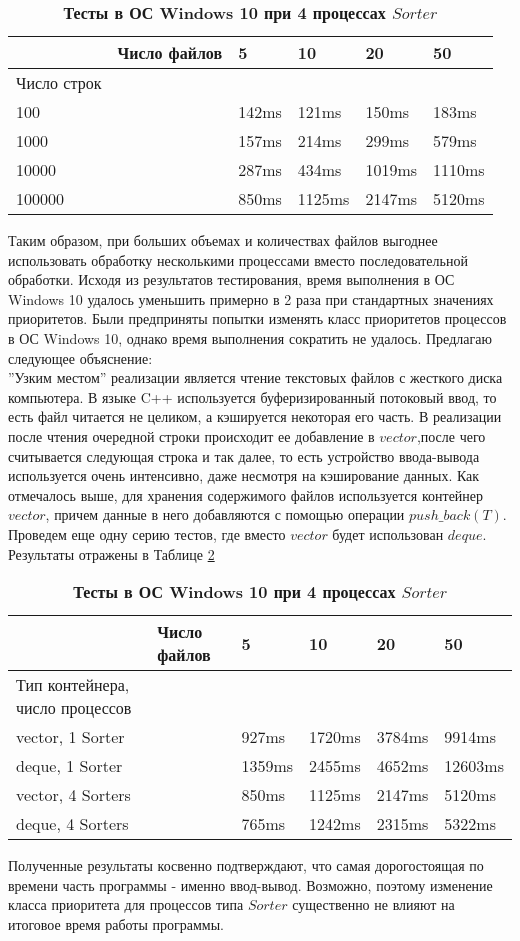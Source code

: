 \begin{table}[H]
\begin{tabularx}{\textwidth}{|X|X|X|X|X|X|}
\hline
&Число файлов& 5 & 10 & 20 & 50 \\
\hline
Число строк&&&&&\\
\hline
100 && 142ms & 121ms & 150ms & 183ms\\
\hline
1000 && 157ms & 214ms & 299ms & 579ms\\
\hline
10000 && 287ms & 434ms & 1019ms & 1110ms\\
\hline
100000 && 850ms & 1125ms & 2147ms & 5120ms\\
\hline
\end{tabularx}
\caption{\textbf{Тесты в ОС Windows 10 при 4 процессах $Sorter$}}
\label{Tables:Windows::tests2}
\end{table}
Таким образом, при больших объемах и количествах файлов выгоднее использовать обработку несколькими процессами вместо последовательной обработки. Исходя из результатов тестирования, время выполнения в ОС Windows 10 удалось уменьшить примерно в 2 раза при стандартных значениях приоритетов. Были предприняты попытки изменять класс приоритетов процессов в ОС Windows 10, однако время выполнения сократить не удалось. Предлагаю следующее объяснение:\\
''Узким местом'' реализации является чтение текстовых файлов с жесткого диска компьютера. В языке C++ используется буферизированный потоковый ввод, то есть файл читается не целиком, а кэшируется некоторая его часть. В реализации после чтения очередной строки происходит ее добавление в $vector$,после чего считывается следующая строка и так далее, то есть устройство ввода-вывода используется очень интенсивно, даже несмотря на кэширование данных. Как отмечалось выше, для хранения содержимого файлов используется контейнер $vector$, причем данные в него добавляются с помощью операции $push\_back(T)$. Проведем еще одну серию тестов, где вместо $vector$ будет использован $deque$. Результаты отражены в Таблице \ref{Tables:Windows::comp}

\begin{table}[H]
\begin{tabularx}{\textwidth}{|X|X|X|X|X|X|}
\hline
&Число файлов& 5 & 10 & 20 & 50 \\
\hline
Тип контейнера, число процессов&&&&&\\
\hline
vector, 1 Sorter && 927ms & 1720ms & 3784ms & 9914ms\\
\hline
deque, 1 Sorter && 1359ms & 2455ms & 4652ms & 12603ms\\
\hline
vector, 4 Sorters && 850ms & 1125ms & 2147ms & 5120ms\\
\hline
deque, 4 Sorters && 765ms & 1242ms & 2315ms & 5322ms\\
\hline
\end{tabularx}
\caption{\textbf{Тесты в ОС Windows 10 при 4 процессах $Sorter$}}
\label{Tables:Windows::comp}
\end{table}

Полученные результаты косвенно подтверждают, что самая дорогостоящая по времени часть программы - именно ввод-вывод. Возможно, поэтому изменение класса приоритета для процессов типа $Sorter$ существенно не влияют на итоговое время работы программы.
